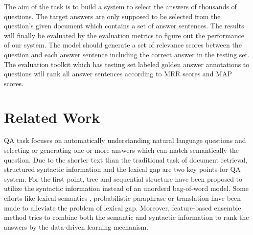 \documentclass{llncs}
\begin{document}
The aim of the task is to build a system to select the answers of thousands of questions. The target answers are only supposed to be selected from the question's given document which contains a set of answer sentences. 
The results will finally be evaluated by the evaluation metrics to figure out the performance of our system. 
The model should generate a set of relevance scores between the question and each answer sentence including the correct answer in the testing set. The evaluation toolkit which has testing set labeled golden answer annotations to questions will rank all answer sentences according to MRR scores and MAP scores. 



\section{Related Work}
\label{sec:relatedword}

QA task focuses on automatically understanding natural language questions and selecting or generating one or more answers which can match semantically the question. %
Due to the shorter text than the traditional task of document retrieval, structured  syntactic information and  the lexical gap are two key points for QA system. 
For the first point, tree \cite{Yao2013Answer} and sequential \cite{Wang2015FAQ} structure have been proposed to utilize the syntactic information instead of an  unorderd bag-of-word model.
Some efforts like lexical semantics \cite{Yih2013Question}, probabilistic paraphrase or translation \cite{Zhou2011Phrase} have been made to alleviate the problem of lexical gap.
Moreover, feature-based ensemble method \cite{Severyn2013Automatic} tries to combine both the semantic and syntactic information to rank the answers by the data-driven learning mechanism. 
\end{document}
